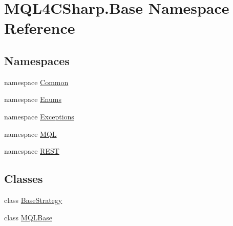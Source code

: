 \hypertarget{namespace_m_q_l4_c_sharp_1_1_base}{}\section{M\+Q\+L4\+C\+Sharp.\+Base Namespace Reference}
\label{namespace_m_q_l4_c_sharp_1_1_base}
\subsection*{Namespaces}
\begin{DoxyCompactItemize}
\item 
namespace \hyperlink{namespace_m_q_l4_c_sharp_1_1_base_1_1_common}{Common}
\item 
namespace \hyperlink{namespace_m_q_l4_c_sharp_1_1_base_1_1_enums}{Enums}
\item 
namespace \hyperlink{namespace_m_q_l4_c_sharp_1_1_base_1_1_exceptions}{Exceptions}
\item 
namespace \hyperlink{namespace_m_q_l4_c_sharp_1_1_base_1_1_m_q_l}{M\+QL}
\item 
namespace \hyperlink{namespace_m_q_l4_c_sharp_1_1_base_1_1_r_e_s_t}{R\+E\+ST}
\end{DoxyCompactItemize}
\subsection*{Classes}
\begin{DoxyCompactItemize}
\item 
class \hyperlink{class_m_q_l4_c_sharp_1_1_base_1_1_base_strategy}{Base\+Strategy}
\item 
class \hyperlink{class_m_q_l4_c_sharp_1_1_base_1_1_m_q_l_base}{M\+Q\+L\+Base}
\end{DoxyCompactItemize}

